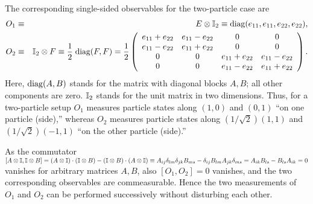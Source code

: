 \documentclass[pra,preprint,showpacs,showkeys,amsfonts]{revtex4}
\begin{document}
The corresponding single-sided observables for the two-particle case are
\begin{eqnarray}
O_1 &\equiv & E \otimes {\Bbb I}_2 \equiv
{\rm diag}(e_{11}, e_{11}, e_{22}, e_{22})
,
\\
O_2 &\equiv & {\Bbb I}_2 \otimes F \equiv  {1\over {2}} \;
{\rm diag}(F, F) =
{1\over {2}}\left(
\begin{array}{cccc}
e_{11} + e_{22}& e_{11} - e_{22}& 0& 0  \\
e_{11} - e_{22}& e_{11} + e_{22}& 0& 0    \\
0& 0& e_{11} + e_{22}& e_{11} - e_{22}      \\
0& 0& e_{11} - e_{22}& e_{11} + e_{22}
\end{array}
\right)
.
\end{eqnarray}
Here, ${\rm diag}(A, B)$ stands for the matrix with diagonal blocks $A,B$; all other components are zero.
${\Bbb I}_2$ stands for the unit matrix in two dimensions.
Thus, for a two-particle setup $O_1$ measures particle states
along $(1,0)$ and $(0,1)$ ``on one particle (side),''
whereas $O_2$ measures particle states along $(1/\sqrt{2})(1,1)$ and $(1/\sqrt{2})(-1,1)$
``on the other particle (side).''

As the commutator
$[A \otimes {\Bbb I},{\Bbb I} \otimes B]=
(A \otimes {\Bbb I})\cdot({\Bbb I} \otimes B) -
({\Bbb I} \otimes B)\cdot(A \otimes {\Bbb I})
\equiv
A_{ij}\delta_{lm}\delta_{jk}B_{ms} -
\delta_{ij}B_{lm}A_{jk}\delta_{ms}
=
A_{ik}B_{ls}-B_{ls}A_{ik}
=0
$
vanishes for arbitrary matrices $A,B$, also $[O_1,O_2]=0$ vanishes,
and the two corresponding observables are commeasurable.
Hence the two measurements of $O_1$ and $O_2$ can be performed successively without
disturbing each other.
\end{document}
